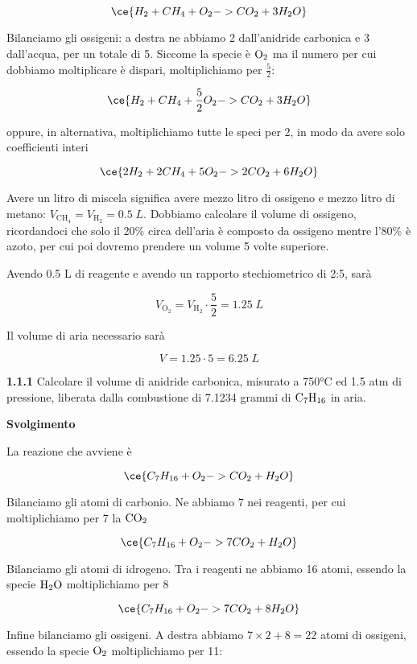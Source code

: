 $$\ce{H_2 + CH_4 + O_2 -> CO_2 + 3H_2O}$$

Bilanciamo gli ossigeni: a destra ne abbiamo 2 dall'anidride carbonica e 3 dall'acqua, per un totale di 5. Siccome la specie è $\rm O_2$ ma il numero per cui dobbiamo moltiplicare è dispari, moltiplichiamo per $\frac{5}{2}$:

$$\ce{H_2 + CH_4 + \frac{5}{2}O_2 -> CO_2 + 3H_2O}$$

oppure, in alternativa, moltiplichiamo tutte le speci per 2, in modo da avere solo coefficienti interi

$$\ce{2H_2 + 2CH_4 + 5O_2 -> 2CO_2 + 6H_2O}$$

Avere un litro di miscela significa avere mezzo litro di ossigeno e mezzo litro di metano: $V_{\text{CH}_4}=V_{\text{H}_2}=0.5\;L$. Dobbiamo calcolare il volume di ossigeno, ricordandoci che solo il 20\% circa dell'aria è composto da ossigeno mentre l'80\% è azoto, per cui poi dovremo prendere un volume 5 volte superiore.

Avendo 0.5 L di reagente e avendo un rapporto stechiometrico di 2:5, sarà

$$V_{\text{O}_2}=V_{\text{H}_2}\cdot\frac{5}{2}=1.25\;L$$

Il volume di aria necessario sarà

$$V=1.25 \cdot 5 = 6.25 \; L$$

\vspace{0.2cm}\textbf{1.1.1} Calcolare il volume di anidride carbonica, misurato a 750°C ed 1.5 atm di pressione, liberata dalla combustione di 7.1234 grammi di $\rm C_7H_{16}$ in aria.

\vspace{0.2cm}\large\textbf{Svolgimento}\normalsize

\vspace{0.2cm}La reazione che avviene è

$$\ce{C_7H_{16} + O_2 -> CO_2 + H_2O}$$

Bilanciamo gli atomi di carbonio. Ne abbiamo 7 nei reagenti, per cui moltiplichiamo per 7 la $\rm CO_2$

$$\ce{C_7H_{16} + O_2 -> 7CO_2 + H_2O}$$

Bilanciamo gli atomi di idrogeno. Tra i reagenti ne abbiamo 16 atomi, essendo la specie $\rm H_2O$ moltiplichiamo per 8

$$\ce{C_7H_{16} + O_2 -> 7CO_2 + 8H_2O}$$

Infine bilanciamo gli ossigeni. A destra abbiamo $7 \times 2 + 8=22$ atomi di ossigeni, essendo la specie $\rm O_2$ moltiplichiamo per 11:

